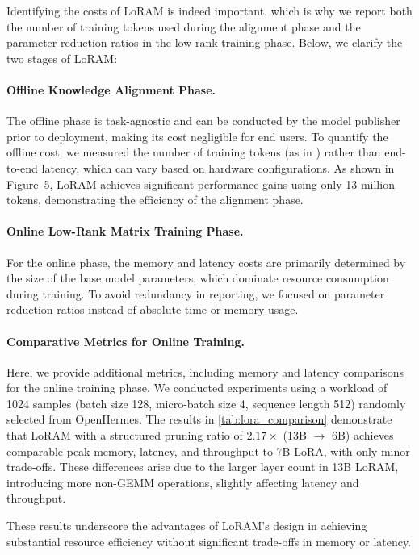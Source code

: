 {Identifying the costs of LoRAM is indeed important, which is why we report both the number of training tokens used during the alignment phase and the parameter reduction ratios in the low-rank training phase. Below, we clarify the two stages of LoRAM:}
{\paragraph{Offline Knowledge Alignment Phase.} 
The offline phase is task-agnostic and can be conducted by the model publisher prior to deployment, making its cost negligible for end users. To quantify the offline cost, we measured the number of training tokens (as in \citet{xia2024sheared}) rather than end-to-end latency, which can vary based on hardware configurations. As shown in Figure~5, LoRAM achieves significant performance gains using only 13 million tokens, demonstrating the efficiency of the alignment phase.}
{\paragraph{Online Low-Rank Matrix Training Phase.} 
For the online phase, the memory and latency costs are primarily determined by the size of the base model parameters, which dominate resource consumption during training. To avoid redundancy in reporting, we focused on parameter reduction ratios instead of absolute time or memory usage.}
{\paragraph{Comparative Metrics for Online Training.}
Here, we provide additional metrics, including memory and latency comparisons for the online training phase. We conducted experiments using a workload of 1024 samples (batch size 128, micro-batch size 4, sequence length 512) randomly selected from OpenHermes. The results in \cref{tab:lora_comparison} demonstrate that LoRAM with a structured pruning ratio of $2.17\times$ (13B $\rightarrow$ 6B) achieves comparable peak memory, latency, and throughput to 7B LoRA, with only minor trade-offs. These differences arise due to the larger layer count in 13B LoRAM, introducing more non-GEMM operations, slightly affecting latency and throughput.}

{These results underscore the advantages of LoRAM's design in achieving substantial resource efficiency without significant trade-offs in memory or latency.}

